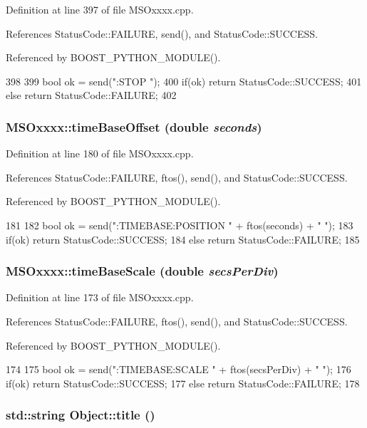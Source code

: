 Definition at line 397 of file MSOxxxx.cpp.

References StatusCode::FAILURE, send(), and StatusCode::SUCCESS.

Referenced by BOOST\_\-PYTHON\_\-MODULE().


\begin{DoxyCode}
398 {
399     bool ok = send(":STOP \n");
400     if(ok)  return StatusCode::SUCCESS;
401     else        return StatusCode::FAILURE;
402 }
\end{DoxyCode}
\hypertarget{classMSOxxxx_ac23ca74ef0e746fe1830bcf26952c42d}{
\subsubsection[{timeBaseOffset}]{ MSOxxxx::timeBaseOffset (double {\em seconds})}}
\label{classMSOxxxx_ac23ca74ef0e746fe1830bcf26952c42d}


Definition at line 180 of file MSOxxxx.cpp.

References StatusCode::FAILURE, ftos(), send(), and StatusCode::SUCCESS.

Referenced by BOOST\_\-PYTHON\_\-MODULE().


\begin{DoxyCode}
181 {
182     bool ok = send(":TIMEBASE:POSITION " + ftos(seconds) + " \n");  
183     if(ok)  return StatusCode::SUCCESS;
184     else        return StatusCode::FAILURE; 
185 }
\end{DoxyCode}
\hypertarget{classMSOxxxx_a0327f511fdb8920ddabf1dbbd54f9e9f}{
\subsubsection[{timeBaseScale}]{ MSOxxxx::timeBaseScale (double {\em secsPerDiv})}}
\label{classMSOxxxx_a0327f511fdb8920ddabf1dbbd54f9e9f}


Definition at line 173 of file MSOxxxx.cpp.

References StatusCode::FAILURE, ftos(), send(), and StatusCode::SUCCESS.

Referenced by BOOST\_\-PYTHON\_\-MODULE().


\begin{DoxyCode}
174 {
175     bool ok = send(":TIMEBASE:SCALE " + ftos(secsPerDiv) + " \n");
176     if(ok)  return StatusCode::SUCCESS;
177     else        return StatusCode::FAILURE; 
178 }
\end{DoxyCode}
\hypertarget{classObject_a73a0f1a41828fdd8303dd662446fb6c3}{
\subsubsection[{title}]{\setlength{\rightskip}{0pt plus 5cm}std::string Object::title ()}}
\label{classObject_a73a0f1a41828fdd8303dd662446fb6c3}


